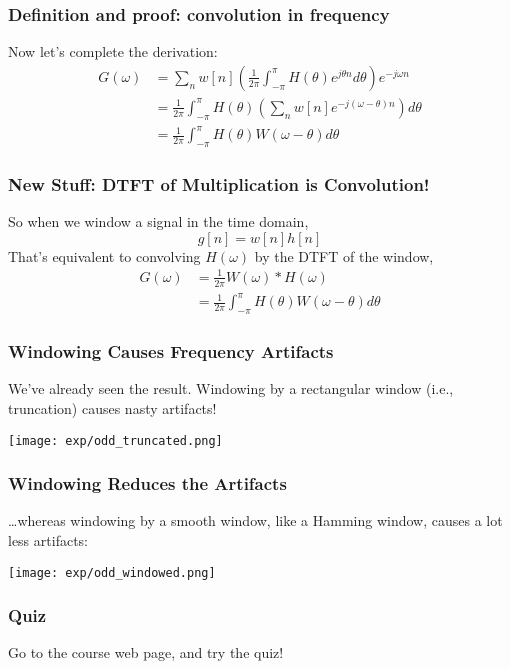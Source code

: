 \documentclass{beamer}
\begin{document}
\begin{frame}
  \frametitle{Definition and proof: convolution in frequency}

  Now let's complete the derivation:
  \begin{align*}
    G(\omega) &= \sum_n w[n]\left(\frac{1}{2\pi}\int_{-\pi}^\pi
    H(\theta)e^{j\theta n}d\theta\right) e^{-j\omega n}\\
    &= \frac{1}{2\pi} \int_{-\pi}^\pi H(\theta)\left(\sum_n w[n]e^{-j(\omega-\theta) n}\right)d\theta\\
    &= \frac{1}{2\pi} \int_{-\pi}^\pi H(\theta)W(\omega-\theta)d\theta
  \end{align*}
\end{frame}

\begin{frame}
  \frametitle{New Stuff: DTFT of Multiplication is Convolution!}

  So when we window a signal in the time domain,
  \[
  g[n] = w[n]h[n]
  \]
  That's equivalent to convolving $H(\omega)$ by the DTFT of the window,
  \begin{align*}
    G(\omega) &= \frac{1}{2\pi} W(\omega) \ast H(\omega)\\
    &= \frac{1}{2\pi} \int_{-\pi}^\pi H(\theta)W(\omega-\theta)d\theta    
  \end{align*}
  
\end{frame}

\begin{frame}
  \frametitle{Windowing Causes Frequency Artifacts}

  We've already seen the result.  Windowing by a rectangular window
  (i.e., truncation) causes nasty artifacts!

  \centerline{\texttt{[image: exp/odd\_truncated.png]}}
\end{frame}

\begin{frame}
  \frametitle{Windowing Reduces the Artifacts}

  \ldots whereas windowing by a smooth window, like a Hamming window,
  causes a lot less artifacts:
  
  \centerline{\texttt{[image: exp/odd\_windowed.png]}}
\end{frame}

\begin{frame}
  \frametitle{Quiz}

  Go to the course web page, and try the quiz!
\end{frame}
\end{document}
